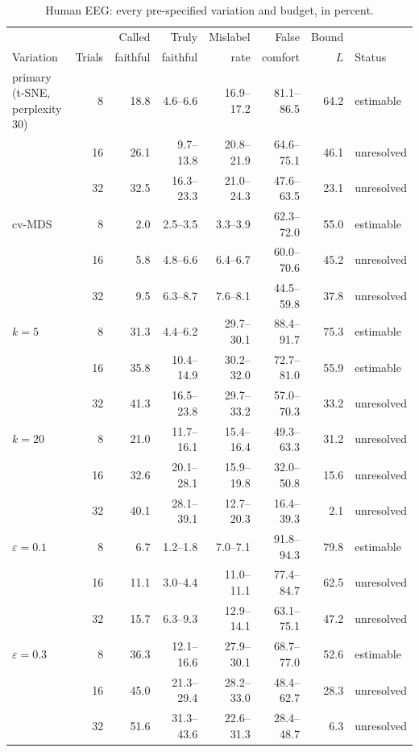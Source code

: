 \documentclass[11pt]{article}
\begin{document}
\begin{table}[!htb]
\centering\scriptsize
\caption{Human EEG: every pre-specified variation and budget, in percent.}
\begin{tabular}{lrrrrrrl}
\toprule
 & & Called & Truly & Mislabel & False & Bound & \\
Variation & Trials & faithful & faithful & rate & comfort & $L$ & Status \\
\midrule
primary (t-SNE, perplexity 30) & 8 & 18.8 & 4.6--6.6 & 16.9--17.2 & 81.1--86.5 & 64.2 & estimable \\
 & 16 & 26.1 & 9.7--13.8 & 20.8--21.9 & 64.6--75.1 & 46.1 & unresolved \\
 & 32 & 32.5 & 16.3--23.3 & 21.0--24.3 & 47.6--63.5 & 23.1 & unresolved \\
\addlinespace
cv-MDS & 8 & 2.0 & 2.5--3.5 & 3.3--3.9 & 62.3--72.0 & 55.0 & estimable \\
 & 16 & 5.8 & 4.8--6.6 & 6.4--6.7 & 60.0--70.6 & 45.2 & unresolved \\
 & 32 & 9.5 & 6.3--8.7 & 7.6--8.1 & 44.5--59.8 & 37.8 & unresolved \\
\addlinespace
$k=5$ & 8 & 31.3 & 4.4--6.2 & 29.7--30.1 & 88.4--91.7 & 75.3 & estimable \\
 & 16 & 35.8 & 10.4--14.9 & 30.2--32.0 & 72.7--81.0 & 55.9 & estimable \\
 & 32 & 41.3 & 16.5--23.8 & 29.7--33.2 & 57.0--70.3 & 33.2 & unresolved \\
\addlinespace
$k=20$ & 8 & 21.0 & 11.7--16.1 & 15.4--16.4 & 49.3--63.3 & 31.2 & unresolved \\
 & 16 & 32.6 & 20.1--28.1 & 15.9--19.8 & 32.0--50.8 & 15.6 & unresolved \\
 & 32 & 40.1 & 28.1--39.1 & 12.7--20.3 & 16.4--39.3 & 2.1 & unresolved \\
\addlinespace
$\varepsilon=0.1$ & 8 & 6.7 & 1.2--1.8 & 7.0--7.1 & 91.8--94.3 & 79.8 & estimable \\
 & 16 & 11.1 & 3.0--4.4 & 11.0--11.1 & 77.4--84.7 & 62.5 & unresolved \\
 & 32 & 15.7 & 6.3--9.3 & 12.9--14.1 & 63.1--75.1 & 47.2 & unresolved \\
\addlinespace
$\varepsilon=0.3$ & 8 & 36.3 & 12.1--16.6 & 27.9--30.1 & 68.7--77.0 & 52.6 & estimable \\
 & 16 & 45.0 & 21.3--29.4 & 28.2--33.0 & 48.4--62.7 & 28.3 & unresolved \\
 & 32 & 51.6 & 31.3--43.6 & 22.6--31.3 & 28.4--48.7 & 6.3 & unresolved \\

\end{tabular}
\end{table}
\end{document}
